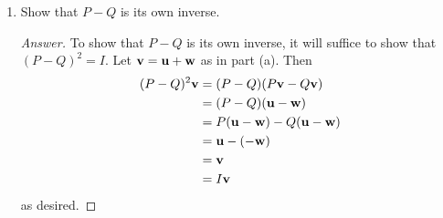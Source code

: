 \documentclass[../psets.tex]{subfiles}
\begin{document}
\begin{enumerate}[label={\textbf{3.\arabic*.}}]
\begin{enumerate}
\begin{proof}[Answer]
\begin{align*}
                &= \um+\wm&
                    &= P\wm\\
                &= \vm&
                    &= \bm{0}\\
                &= I\vm&
                    &= 0\vm
            \end{align*}
            so $P+Q=I$ and $PQ=0$.
        \end{proof}
        \item Show that $P-Q$ is its own inverse.
        \begin{proof}[Answer]
            To show that $P-Q$ is its own inverse, it will suffice to show that $(P-Q)^2=I$. Let $\mathbf{v}=\mathbf{u}+\mathbf{w}$ as in part (a). Then
            \begin{align*}
                (P-Q)^2\mathbf{v} &= (P-Q)(P\mathbf{v}-Q\mathbf{v})\\
                &= (P-Q)(\mathbf{u}-\mathbf{w})\\
                &= P(\mathbf{u}-\mathbf{w})-Q(\mathbf{u}-\mathbf{w})\\
                &= \mathbf{u}-(-\mathbf{w})\\
                &= \mathbf{v}\\
                &= I\mathbf{v}
            \end{align*}
            as desired.
        \end{proof}
    \end{enumerate}
\end{enumerate}
\end{document}
